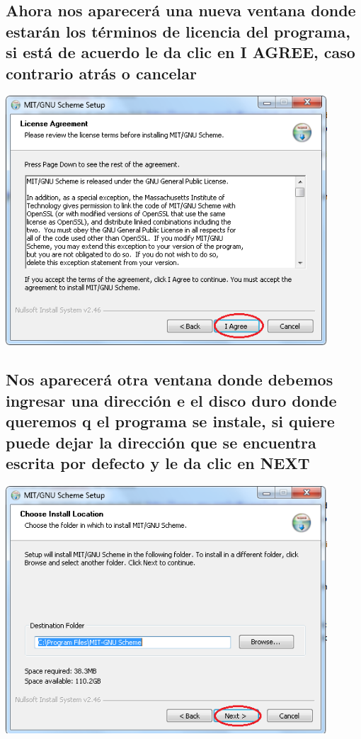\documentclass[11pt]{article} %
\begin{document}
\subsection{Ahora nos aparecerá una nueva ventana donde estarán los términos de licencia del programa, si está de acuerdo le da clic en  I AGREE, caso contrario atrás o cancelar}
\begin{center}
\includegraphics[width=12cm]{3.png}
\end{center}

\subsection{Nos aparecerá otra ventana donde debemos ingresar una dirección e el disco duro donde queremos q el programa se instale, si quiere puede dejar la dirección que se encuentra escrita por defecto y le da clic en NEXT}
\begin{center}
\includegraphics[width=12cm]{4.png}
\end{center}
\end{document}
